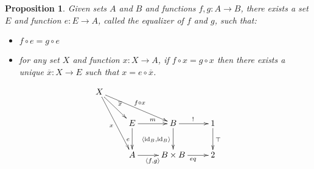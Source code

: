 \documentclass{book}
\newtheorem{prop}[ax]{Proposition}
\theoremstyle{definition}
\newcommand{\id}[1]{\ensuremath{\mathrm{id}_{#1}}}
\begin{document}
\begin{prop}
Given sets $A$ and $B$ and functions $f,g : A \rightarrow B$, there exists a set $E$ and function $e : E \rightarrow A$, called the \emph{equalizer} of $f$ and $g$, such that:
\begin{itemize}
\item $f \circ e = g \circ e$
\item for any set $X$ and function $x : X \rightarrow A$, if $f \circ x = g \circ x$ then there exists a unique $\overline{x} : X \rightarrow E$ such that $x = e \circ \overline{x}$.
\end{itemize}
\end{prop}

\[ \xymatrix{
X \ar[ddr]_x \ar[drr]^{f \circ x} \ar[dr]^{\overline{x}} \\
& E \ar[d]_e \ar[r]^m & B \ar[d]_{\langle \id{B}, \id{B} \rangle} \ar[r]^{!} & 1 \ar[d]^{\top} \\
& A \ar[r]_{\langle f,g \rangle} & B \times B \ar[r]_{eq} & 2
} \]
\end{document}
